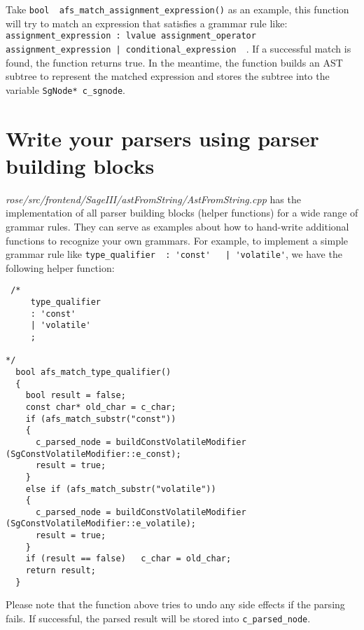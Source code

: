 Take \lstinline{bool  afs_match_assignment_expression()} as an example, this function will try to match an expression that satisfies a grammar rule like: \\
\lstinline{assignment_expression : lvalue assignment_operator assignment_expression | conditional_expression  }. If a successful match is found, the function returns true.
In the meantime, the function builds an AST subtree to represent the matched expression and stores the subtree into the variable \lstinline{SgNode* c_sgnode}.  

\section{Write your parsers using parser building blocks}
\textit{rose/src/frontend/SageIII/astFromString/AstFromString.cpp} has the implementation of all parser building blocks (helper functions) for a wide range of grammar rules. 
They can serve as examples about how to hand-write additional functions to recognize your own grammars. 
For example, to implement a simple grammar rule like \lstinline{type_qualifier  : 'const'   | 'volatile'}, we have the following helper function:
\begin{verbatim}
 /*
     type_qualifier
     : 'const'
     | 'volatile'
     ;

*/
  bool afs_match_type_qualifier()
  {
    bool result = false;
    const char* old_char = c_char;
    if (afs_match_substr("const"))
    {
      c_parsed_node = buildConstVolatileModifier (SgConstVolatileModifier::e_const);
      result = true;
    }
    else if (afs_match_substr("volatile"))
    {
      c_parsed_node = buildConstVolatileModifier (SgConstVolatileModifier::e_volatile);
      result = true;
    }
    if (result == false)   c_char = old_char;
    return result;
  }
\end{verbatim}
Please note that the function above tries to undo any side effects if the parsing fails. If successful, the parsed result will be stored into \lstinline{c_parsed_node}.

